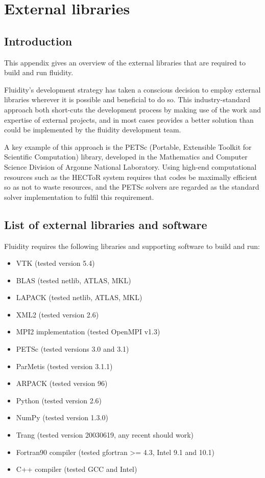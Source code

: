 \chapter{External libraries}\label{chap:external}

\section{Introduction}
This appendix gives an overview of the external libraries that are required to
build and run fluidity.

Fluidity's development strategy has taken a conscious decision to employ
external libraries wherever it is possible and beneficial to do so. This
industry-standard approach both short-cuts the development process by making
use of the work and expertise of external projects, and in most cases provides
a better solution than could be implemented by the fluidity development team.

A key example of this approach is the PETSc (Portable, Extensible Toolkit for
Scientific Computation) library, developed in the Mathematics and Computer
Science Division of Argonne National Laboratory. Using high-end computational
resources such as the HECToR system requires that codes be maximally efficient
so as not to waste resources, and the PETSc solvers are regarded as the
standard solver implementation to fulfil this requirement.

\section{List of external libraries and software}
\label{sect:required_ḻibraries_list}

Fluidity requires the following libraries and supporting software to build and
run:

\begin{itemize}
\item VTK (tested version 5.4)
\item BLAS (tested netlib, ATLAS, MKL)
\item LAPACK (tested netlib, ATLAS, MKL)
\item XML2 (tested version 2.6)
\item MPI2 implementation (tested OpenMPI v1.3)
\item PETSc (tested versions 3.0 and 3.1)
\item ParMetis (tested version 3.1.1)
\item ARPACK (tested version 96)
\item Python (tested version 2.6) 
\item NumPy (tested version 1.3.0)
\item Trang (tested version 20030619, any recent should work)
\item Fortran90 compiler (tested gfortran >= 4.3, Intel 9.1 and 10.1)
\item C++ compiler (tested GCC and Intel)
\end{itemize}


